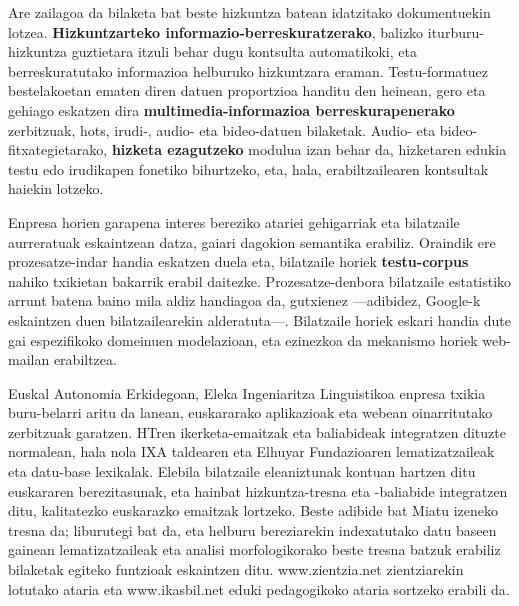 \begin{multicols}{2}
Are zailagoa da bilaketa bat beste hizkuntza batean idatzitako dokumentuekin lotzea. \textbf{Hizkuntzarteko informazio-berresku\-ratzerako}, balizko iturburu-hizkuntza guztietara itzuli behar dugu kontsulta automatikoki, eta berreskuratutako informazioa helburuko hizkuntzara eraman. Testu-formatuez bestelakoetan ematen diren datuen proportzioa handitu den heinean, gero eta gehiago eskatzen dira \textbf{multimedia-informazioa berreskurapenerako} zerbitzuak, hots, irudi-, audio- eta bideo-datuen bilaketak. Audio- eta bideo-fitxategietarako, \textbf{hizketa ezagutzeko} modulua izan behar da, hizketaren edukia testu edo irudikapen fonetiko bihurtzeko, eta, hala, erabiltzailearen kontsultak haiekin lotzeko.

Enpresa horien garapena interes bereziko atariei gehigarriak eta bilatzaile aurreratuak eskaintzean datza, gaiari dagokion semantika erabiliz. Oraindik ere prozesatze-indar handia eskatzen duela eta, bilatzaile horiek \textbf{testu-corpus} nahiko txikietan bakarrik erabil daitezke. Prozesatze-denbora bilatzaile estatistiko arrunt batena baino mila aldiz handiagoa da, gutxienez —adibidez, Google-k eskaintzen duen bilatzailearekin alderatuta—. Bilatzaile horiek eskari handia dute gai espezifikoko domeinuen modelazioan, eta ezinezkoa da mekanismo horiek web-mailan erabiltzea.


Euskal Autonomia Erkidegoan, Eleka Ingeniaritza Linguistikoa enpresa txikia buru-belarri aritu da lanean, euskararako aplikazioak eta webean oinarritutako zerbitzuak garatzen. HTren ikerketa-emaitzak eta baliabideak integratzen dituzte normalean, hala nola IXA taldearen eta Elhuyar Fundazioaren lematizatzaileak eta datu-base lexikalak. Elebila bilatzaile eleaniztunak kontuan hartzen ditu euskararen berezitasunak, eta hainbat hizkuntza-tresna eta -baliabide integratzen ditu, kalitatezko euskarazko emaitzak lortzeko. Beste adibide bat Miatu izeneko tresna da; liburutegi bat da, eta helburu bereziarekin indexatutako datu baseen gainean lematizatzaileak eta analisi morfologikorako beste tresna batzuk erabiliz bilaketak egiteko funtzioak eskaintzen ditu. www.zientzia.net zientziarekin lotutako ataria eta www.ikasbil.net eduki pedagogikoko ataria sortzeko erabili da.
  

\end{multicols}
